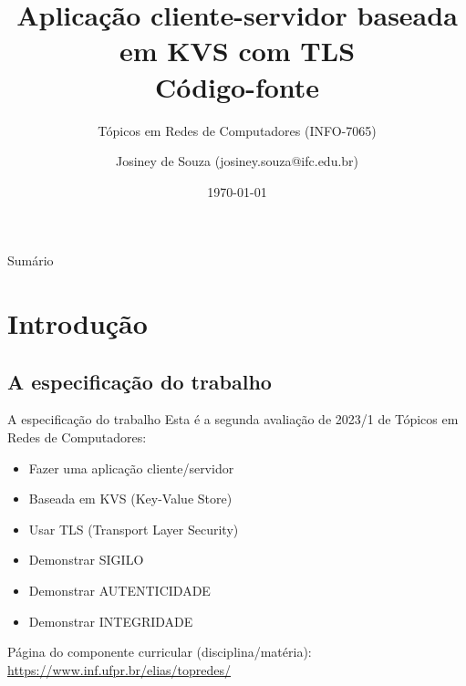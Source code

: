 \documentclass[xcolor=dvipsnames,table]{beamer}
\title{Aplicação cliente-servidor baseada em KVS com TLS\\ Código-fonte}
\subtitle{Tópicos em Redes de Computadores (INFO-7065)}
\author{Josiney de Souza (josiney.souza@ifc.edu.br)}
\institute{UFPR / DInf}
\date{\today}
\begin{document}

\begin{frame}[plain]{}
    \maketitle
\end{frame}

{\small
\begin{frame}[plain]{Sumário}
    \tableofcontents
\end{frame}
}

\section{Introdução}
\subsection{A especificação do trabalho}
\begin{frame}{A especificação do trabalho}
	Esta é a segunda avaliação de 2023/1 de Tópicos em Redes de Computadores:
	\begin{itemize}
		\item Fazer uma aplicação cliente/servidor
		\item Baseada em KVS (Key-Value Store)
		\item Usar TLS (Transport Layer Security)
		\item Demonstrar SIGILO
		\item Demonstrar AUTENTICIDADE
		\item Demonstrar INTEGRIDADE
	\end{itemize}
	Página do componente curricular (disciplina/matéria): \url{https://www.inf.ufpr.br/elias/topredes/}
\end{frame}
\end{document}

